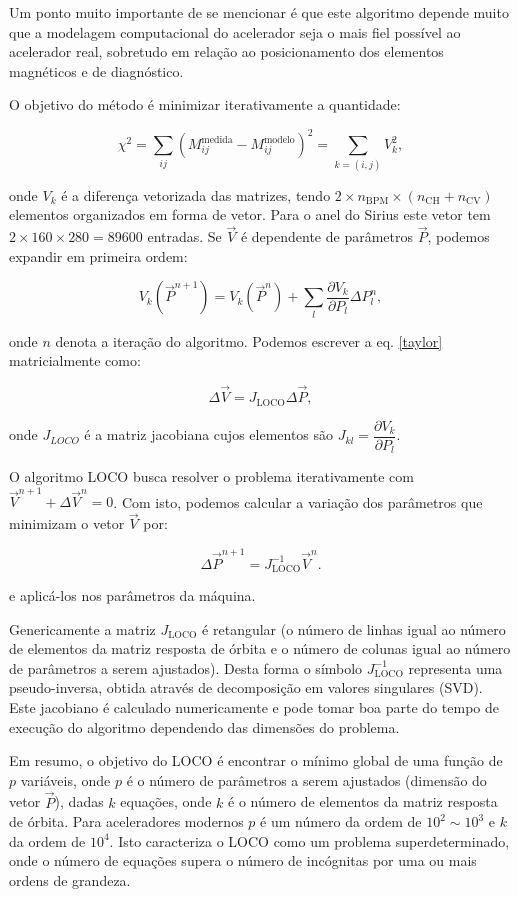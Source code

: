 Um ponto muito importante de se mencionar é que este algoritmo depende muito que a modelagem computacional do acelerador seja o mais fiel possível ao acelerador real, sobretudo em relação ao posicionamento dos elementos magnéticos e de diagnóstico.

O objetivo do método é minimizar iterativamente a quantidade:

\begin{equation}
    \chi^2 = \sum_{ij} \left(M^{\mathrm{medida}}_{ij} - M^{\mathrm{modelo}}_{ij}\right)^2 = \sum_{{k = (i,j)}} V_{k}^2,
\end{equation}

onde $V_{k}$ é a diferença vetorizada das matrizes, tendo $2 \times n_{\mathrm{BPM}} \times (n_\mathrm{{CH}} + n_\mathrm{{CV}})$ elementos organizados em forma de vetor. Para o anel do Sirius este vetor tem $2 \times 160 \times 280 = 89600$ entradas. Se $\vec{V}$ é dependente de parâmetros $\vec{P}$, podemos expandir em primeira ordem:

\begin{equation}
V_{k}(\vec{P}^{n+1}) = V_{k}(\vec{P}^{n}) + \sum_{l}\dfrac{\partial V_{k}}{\partial P_{l}} \Delta P_{l}^{n},
\label{taylor}
\end{equation}

onde $n$ denota a iteração do algoritmo. Podemos escrever a eq. \eqref{taylor} matricialmente como:

\begin{equation}
    \Delta \vec{V}  = J_{\mathrm{LOCO}} \Delta \vec{P},
\end{equation}

onde $J_{LOCO}$ é a matriz jacobiana cujos elementos são $J_{kl} = \dfrac{\partial V_{k}}{\partial P_{l}}$.

O algoritmo LOCO busca resolver o problema iterativamente com $\vec{V}^{n+1} + \Delta \vec{V}^n = 0$. Com isto, podemos calcular a variação dos parâmetros que minimizam o vetor $\vec{V}$ por:

\begin{equation}
    \Delta \vec{P}^{n+1} = J_{\mathrm{LOCO}}^{-1} \vec{V}^{n}.
\end{equation}

e aplicá-los nos parâmetros da máquina. 

Genericamente a matriz $J_{\mathrm{LOCO}}$ é retangular (o número de linhas igual ao número de elementos da matriz resposta de órbita e o número de colunas igual ao número de parâmetros a serem ajustados). Desta forma o símbolo $J_{\mathrm{LOCO}}^{-1}$ representa uma pseudo-inversa, obtida através de decomposição em valores singulares (SVD). Este jacobiano é calculado numericamente e pode tomar boa parte do tempo de execução do algoritmo dependendo das dimensões do problema.

Em resumo, o objetivo do LOCO é encontrar o mínimo global de uma função de $p$ variáveis, onde $p$ é o número de parâmetros a serem ajustados (dimensão do vetor $\vec{P}$), dadas $k$ equações, onde $k$ é o número de elementos da matriz resposta de órbita. Para aceleradores modernos $p$ é um número da ordem de $10^{2} \sim 10^{3}$ e $k$ da ordem de $10^4$. Isto caracteriza o LOCO como um problema superdeterminado, onde o número de equações supera o número de incógnitas por uma ou mais ordens de grandeza.